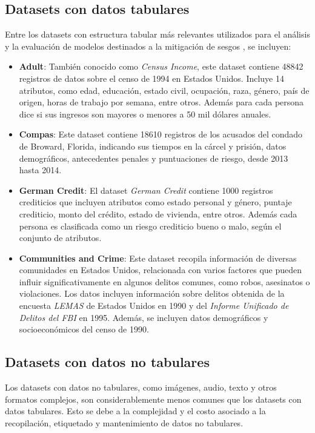     \subsection{Datasets con datos tabulares}
    Entre los datasets con estructura tabular m\'as relevantes utilizados para el an\'alisis y la evaluaci\'on de modelos destinados 
    a la mitigaci\'on de sesgos \parencite{calmon2017optimized,wang2023mitigating,compas}, se incluyen:

    \begin{itemize}
        \item \textbf{Adult}: Tambi\'en conocido como \textit{Census Income}, este dataset contiene 48842 registros de 
        datos sobre el censo de 1994 en Estados Unidos. Incluye 14 atributos, como edad, educaci\'on, estado civil,
        ocupaci\'on, raza, g\'enero, pa\'is de origen, horas de trabajo por semana, entre otros. Adem\'as para cada 
        persona dice si sus ingresos son mayores o menores a 50 mil d\'olares anuales.
        \item \textbf{Compas}: Este dataset contiene 18610 registros de los acusados del condado de Broward, Florida,
        indicando sus tiempos en la c\'arcel y prisi\'on, datos demogr\'aficos, antecedentes penales y puntuaciones 
        de riesgo, desde 2013 hasta 2014.
        \item \textbf{German Credit}: El dataset \textit{German Credit} contiene 1000 registros crediticios que incluyen atributos 
        como estado personal y g\'enero, puntaje crediticio, monto del cr\'edito, estado de vivienda, entre otros. Adem\'as cada 
        persona es clasificada como un riesgo crediticio bueno o malo, seg\'un el conjunto de atributos.
        \item \textbf{Communities and Crime}: Este dataset recopila informaci\'on de diversas comunidades en Estados Unidos, 
        relacionada con varios factores que pueden influir significativamente en algunos delitos comunes, como robos, asesinatos o 
        violaciones. Los datos incluyen informaci\'on sobre delitos obtenida de la encuesta \textit{LEMAS} de Estados Unidos en 1990 y 
        del \textit{Informe Unificado de Delitos del FBI} en 1995. Adem\'as, se incluyen datos demogr\'aficos y socioecon\'omicos del 
        censo de 1990.

    \end{itemize}

    \subsection{Datasets con datos no tabulares}
    Los datasets con datos no tabulares, como im\'agenes, audio, texto y otros formatos complejos, son considerablemente menos comunes
    que los datasets con datos tabulares. Esto se debe a la complejidad y el costo asociado a la recopilaci\'on, etiquetado y mantenimiento
    de datos no tabulares.

